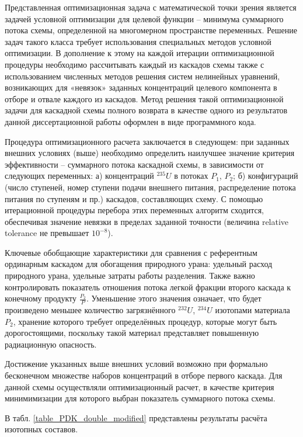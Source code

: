Представленная оптимизационная задача с математической точки зрения является задачей условной оптимизации для целевой функции -- минимума суммарного потока схемы, определенной на многомерном пространстве переменных. Решение задач такого класса требует использования специальных методов условной оптимизации. В дополнение к этому на каждой итерации оптимизационной процедуры необходимо рассчитывать каждый из каскадов схемы также с использованием численных методов решения систем нелинейных уравнений, возникающих для «невязок» заданных концентраций целевого компонента в отборе и отвале каждого из каскадов. Метод решения такой оптимизационной задачи для каскадной схемы полного возврата в качестве одного из результатов данной диссертационной работы оформлен в виде программного кода. 

Процедура оптимизационного расчета заключается в следующем: при заданных внешних условиях (выше) необходимо определить наилучшее значение критерия эффективности -- суммарного потока каскадной схемы, в зависимости от следующих переменных: а) концентраций $^{235}U$ в потоках $P_1$, $P_2$; б) конфигураций (число ступеней, номер ступени подачи внешнего питания, распределение потока питания по ступеням и пр.) каскадов, составляющих схему. С помощью итерационной процедуры перебора этих переменных алгоритм сходится, обеспечивая значение невязки в пределах заданной точности (величина relative tolerance не превышает $10^{-8}$).
 
Ключевые обобщающие характеристики для сравнения с референтным ординарным каскадом для обогащения природного урана: удельный расход природного урана, удельные затраты работы разделения. Также важно контролировать показатель отношения потока легкой фракции второго каскада к конечному продукту $\frac{P_2}{P}$. Уменьшение этого значения означает, что будет произведено меньшее количество загрязнённого $^{232}U$, $^{234}U$ изотопами материала $P_2$, хранение которого требует определённых процедур, которые могут быть дорогостоящими, поскольку такой материал представляет повышенную радиационную опасность.

Достижение указанных выше внешних условий возможно при формально бесконечном множестве наборов концентраций в отборе первого каскада. Для данной схемы осуществляли оптимизационный расчет, в качестве критерия минимимизации для которого выбран показатель суммарного потока схемы. 

В табл. \ref{table_PDK_double_modified} представлены результаты расчёта изотопных составов.

